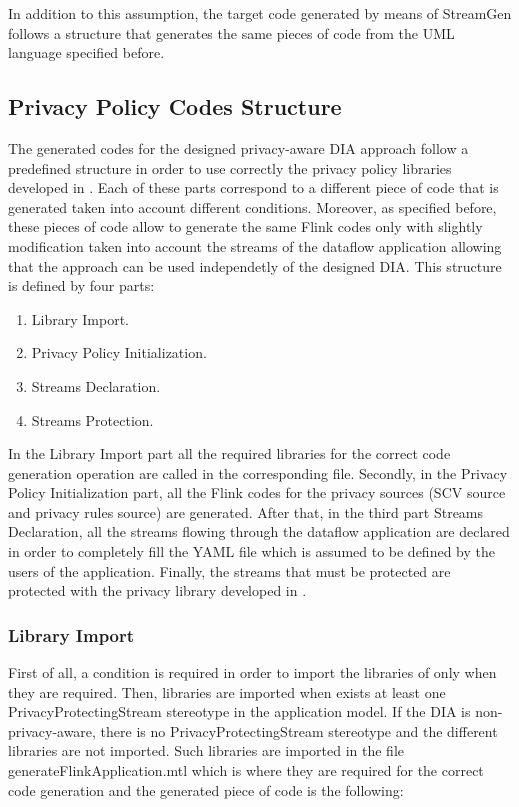 In addition to this assumption, the target code generated by means of StreamGen follows a structure that generates the same pieces of code from the UML language specified before.

\subsection{Privacy Policy Codes Structure}

The generated codes for the designed privacy-aware DIA approach follow a predefined structure in order to use correctly the privacy policy libraries developed in \cite{privacypoliciesarticle}. Each of these parts correspond to a different piece of code that is generated taken into account different conditions. Moreover, as specified before, these pieces of code allow to generate the same Flink codes only with slightly modification taken into account the streams of the dataflow application allowing that the approach can be used independetly of the designed DIA. This structure is defined by four parts:

\begin{enumerate}
\item Library Import.
\item Privacy Policy Initialization.
\item Streams Declaration.
\item Streams Protection.
\end{enumerate}

In the Library Import part all the required libraries for the correct code generation operation are called in the corresponding file. Secondly, in the Privacy Policy Initialization part, all the Flink codes for the privacy sources (SCV source and privacy rules source) are generated. After that, in the third part Streams Declaration, all the streams flowing through the dataflow application are declared in order to completely fill the YAML file which is assumed to be defined by the users of the application. Finally, the streams that must be protected are protected with the privacy library developed in \cite{privacypoliciesarticle}.

\subsubsection{Library Import}

First of all, a condition is required in order to import the libraries of \cite{privacypoliciesarticle} only when they are required. Then, libraries are imported when exists at least one PrivacyProtectingStream stereotype in the application model. If the DIA is non-privacy-aware, there is no PrivacyProtectingStream stereotype and the different libraries are not imported. Such libraries are imported in the file generateFlinkApplication.mtl which is where they are required for the correct code generation and the generated piece of code is the following:


